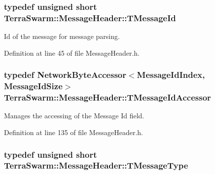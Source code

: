 \hypertarget{class_terra_swarm_1_1_message_header_acc3ebce9679077b0e438532be7c7bf6d}{
\subsubsection[{T\-Message\-Id}]{\setlength{\rightskip}{0pt plus 5cm}typedef unsigned short {\bf Terra\-Swarm\-::\-Message\-Header\-::\-T\-Message\-Id}}}\label{class_terra_swarm_1_1_message_header_acc3ebce9679077b0e438532be7c7bf6d}


Id of the message for message parsing. 



Definition at line 45 of file Message\-Header.\-h.

\hypertarget{class_terra_swarm_1_1_message_header_a269de9ac839cc588d65fad2e27f6dcbb}{
\subsubsection[{T\-Message\-Id\-Accessor}]{\setlength{\rightskip}{0pt plus 5cm}typedef {\bf Network\-Byte\-Accessor}$<${\bf Message\-Id\-Index}, {\bf Message\-Id\-Size}$>$ {\bf Terra\-Swarm\-::\-Message\-Header\-::\-T\-Message\-Id\-Accessor}\hspace{0.3cm}{\ttfamily [private]}}}\label{class_terra_swarm_1_1_message_header_a269de9ac839cc588d65fad2e27f6dcbb}


Manages the accessing of the Message Id field. 



Definition at line 135 of file Message\-Header.\-h.

\hypertarget{class_terra_swarm_1_1_message_header_a6eaf3733d65fa5eaac0c223da4f5670c}{
\subsubsection[{T\-Message\-Type}]{\setlength{\rightskip}{0pt plus 5cm}typedef unsigned short {\bf Terra\-Swarm\-::\-Message\-Header\-::\-T\-Message\-Type}}}\label{class_terra_swarm_1_1_message_header_a6eaf3733d65fa5eaac0c223da4f5670c}


